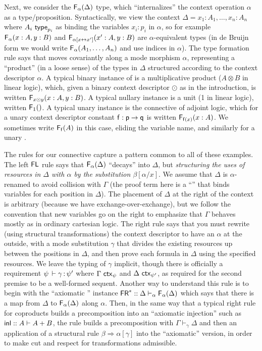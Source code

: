 \documentclass[a4paper,USenglish,numberwithinsect]{lipics-v2016}
\newcommand\spr{\ensuremath{\Rightarrow}} %
\newcommand\seq[3]{\ensuremath{#1 \vdash_{#2} #3}}
\newcommand\F[2]{\ensuremath{\dsd{F}_{#1}(#2)}}
\renewcommand\subst[3]{\ensuremath{#1[#2/#3]}}
\newcommand\wftype[2]{\ensuremath{#1 \,\, \dsd{type}_{#2}}}
\renewcommand\wfctx[2]{\ensuremath{#1 \,\, \dsd{ctx}_{#2}}}
\renewcommand{\oftp}[3]{\ensuremath{#1 \, \vdash #2 \, \dcd{:} \, #3}}
\newcommand\FL{\dsd{FL}}
\newcommand\FR{\dsd{FR}}
\begin{document}
Next, we consider the \F{\alpha}{\Delta} type, which ``internalizes''
the context operation $\alpha$ as a type/proposition.  Syntactically, we
view the context $\Delta = x_1:A_1,\ldots,x_n:A_n$ where
\wftype{A_i}{p_i} as binding the variables $x_i:p_i$ in $\alpha$, so for
example \F{\alpha}{x:A,y:B} and \F{\alpha[x \leftrightarrow
    x']}{x':A,y:B} are $\alpha$-equivalent types (in de Bruijn form we
would write \F{\alpha}{A_1,\ldots,A_n} and use indices in $\alpha$).
The type formation rule says that  moves covariantly along a mode
morphism $\alpha$, representing a ``product'' (in a loose sense) of the
types in $\Delta$ structured according to the context descriptor
$\alpha$. A typical binary instance of  is a multiplicative
product ($A \otimes B$ in linear logic), which, given a binary context
descriptor $\odot$ as in the introduction, is written \F{x \odot
  y}{x:A,y:B}.  A typical nullary instance is a unit (1 in linear
logic), written \F{1}{}.  A typical unary instance is the 
connective of adjoint logic, which for a unary context descriptor
constant $\mathsf{f} : \mathsf{p} \to \mathsf{q}$ is written \F{\dsd{f}(x)}{x:A}.
We sometimes write \F{\dsd{f}}{A} in this case, eliding the variable
name, and similarly for a unary .

The rules for our  connective capture a pattern common to all of
these examples.  The left $\FL$ rule says that \F{\alpha}{\Delta}
``decays'' into $\Delta$, but \emph{structuring the uses of resources in
  $\Delta$ with $\alpha$ by the substitution \subst{\beta}{\alpha}{x}}.
We assume that $\Delta$ is $\alpha$-renamed to avoid collision with
$\Gamma$ (the proof term here is a ``'' that binds
variables for each position in $\Delta$).  The placement of $\Delta$ at
the right of the context is arbitrary (because we have
exchange-over-exchange), but we follow the convention that new variables
go on the right to emphasize that $\Gamma$ behaves mostly as in ordinary
cartesian logic.  The right \FR\/ rule says that you must rewrite (using
structural transformations) the context descriptor to have an $\alpha$
at the outside, with a mode substitution $\gamma$ that divides the
existing resources up between the positions in $\Delta$, and then prove
each formula in $\Delta$ using the specified resources.  We leave the
typing of $\gamma$ implicit, though there is officially a requirement
$\oftp{\psi}{\gamma}{\psi'}$ where $\wfctx{\Gamma}{\psi}$ and
$\wfctx{\Delta}{\psi'}$, as required for the second premise to be a
well-formed sequent.  Another way to understand this rule is to begin
with the ``axiomatic \FR'' instance 
$\FR^* :: {\seq{\Delta}{\alpha}{\F{\alpha}{\Delta}}}{}$
which says that there is a map from $\Delta$ to \F{\alpha}{\Delta} along
$\alpha$.  Then, in the same way that a typical right rule for
coproducts builds a precomposition into an ``axiomatic injection'' such
as $\mathsf{inl} :: A \vdash A + B$, the \FR\/ rule builds a precomposition
with $\seq{\Gamma}{\gamma}{\Delta}$ and then an application of a
structural rule $\beta \spr \alpha[\gamma]$ into the ``axiomatic''
version, in order to make cut and respect for transformations
admissible.
\end{document}

